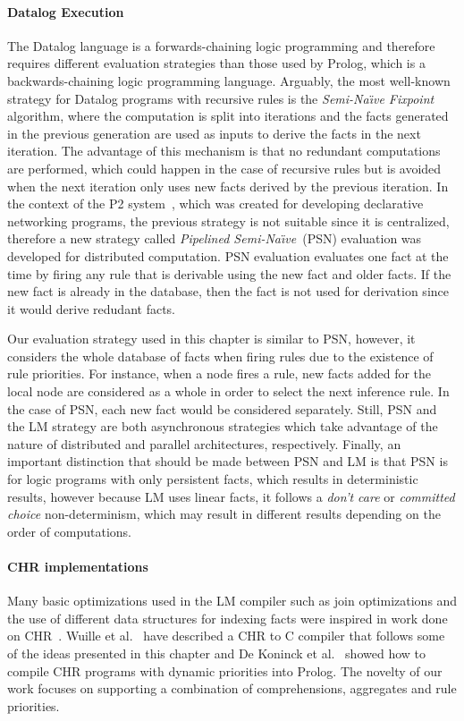 \paragraph{Datalog Execution} The Datalog language is a forwards-chaining logic
programming and therefore requires different evaluation strategies than those
used by Prolog, which is a backwards-chaining logic programming language.
Arguably, the most well-known strategy for Datalog programs with recursive rules
is the \emph{Semi-Na\"{\i}ve Fixpoint}~\cite{Balbin:1987:GDA:34657.34661}
   algorithm, where the computation is split into iterations and the facts
   generated in the previous generation are used as inputs to derive the facts
   in the next iteration. The advantage of this mechanism is that no redundant
   computations are performed, which could happen in the case of recursive rules
   but is avoided when the next iteration only uses new facts derived by the
   previous iteration. In the context of the P2
   system~\cite{Loo-condie-garofalakis-p2}, which was created for developing
   declarative networking programs, the previous strategy is not suitable since
   it is centralized, therefore a new strategy called \emph{Pipelined
      Semi-Na\"{\i}ve}~(PSN) evaluation was developed for distributed
      computation. PSN evaluation evaluates one fact at the time by firing any
      rule that is derivable using the new fact and older facts. If the new fact
      is already in the database, then the fact is not used for derivation since
      it would derive redudant facts.

 Our evaluation strategy used in this chapter is similar to PSN, however, it
 considers the whole database of facts when firing rules due to the existence of
 rule priorities. For instance, when a node fires a rule, new facts added for
 the local node are considered as a whole in order to select the next inference
 rule. In the case of PSN, each new fact would be considered separately. Still,
 PSN and the LM strategy are both asynchronous strategies which take advantage
 of the nature of distributed and parallel architectures, respectively. Finally,
 an important distinction that should be made between PSN and LM is that PSN is
 for logic programs with only persistent facts, which results in deterministic
 results, however because LM uses linear facts, it follows a \emph{don't care}
 or \emph{committed choice} non-determinism, which may result in different
 results depending on the order of computations.

\paragraph{CHR implementations} Many basic optimizations used in the LM compiler
such as join optimizations and the use of different data structures for indexing
facts were inspired in work done on CHR~\cite{DBLP:journals/corr/cs-PL-0408025}.
Wuille et al.~\cite{42866} have described a CHR to C compiler that follows some
of the ideas presented in this chapter and De Koninck et al.~\cite{chrp} showed
how to compile CHR programs with dynamic priorities into Prolog. The novelty of
our work focuses on supporting a combination of comprehensions, aggregates and
rule priorities.

